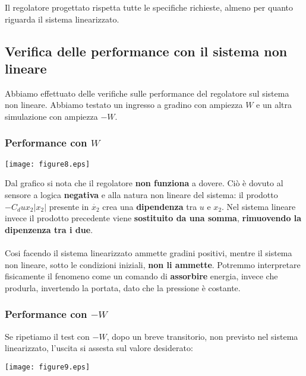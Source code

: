 \documentclass{article}
\begin{document}
Il regolatore progettato rispetta tutte le specifiche richieste, almeno per quanto riguarda il sistema linearizzato.

\newpage

\subsection{Verifica delle performance con il sistema non lineare}
Abbiamo effettuato delle verifiche sulle performance del regolatore sul sistema non lineare. Abbiamo testato un ingresso a gradino con ampiezza $W$ e un altra simulazione con ampiezza $-W$.

\subsubsection{Performance con $W$}

\begin{center}
    \texttt{[image: figure8.eps]}
\end{center}

Dal grafico si nota che il regolatore \textbf{non funziona} a dovere. Ciò è dovuto al sensore a logica \textbf{negativa} e alla natura non lineare del sistema: il prodotto $-C_d u x_2 |x_2|$ presente in $\dot{x_2}$ crea una \textbf{dipendenza} tra $u$ e $x_2$. Nel sistema lineare invece il prodotto precedente viene \textbf{sostituito da una somma}, \textbf{rimuovendo la dipenzenza tra i due}.\\\\
Cosi facendo il sistema linearizzato ammette gradini positivi, mentre il sistema non lineare, sotto le condizioni iniziali, \textbf{non li ammette}. Potremmo interpretare fisicamente il fenomeno come un comando di \textbf{assorbire} energia, invece che produrla, invertendo la portata, dato che la pressione è costante.

\newpage

\subsubsection{Performance con $-W$}

Se ripetiamo il test con $-W$, dopo un breve transitorio, non previsto nel sistema linearizzato, l'uscita si assesta sul valore desiderato:

\begin{center}
    \texttt{[image: figure9.eps]}
\end{center}
\end{document}
